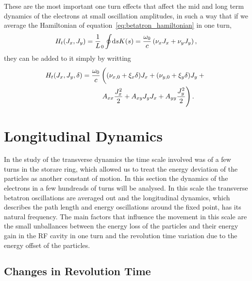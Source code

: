     These are the most important one turn effects that affect the mid and long term dynamics of the electrons at small oscillation amplitudes, in such a way that if we average the Hamiltonian of equation~\eqref{eq:betatron_hamiltonian} in one turn,
    \begin{align}
        H_t(J_x, J_y) = \frac1L_0\oint\!\text{d}s K(s) = \frac{\omega_0}{c}\left(\nu_xJ_x + \nu_yJ_y\right),
    \end{align}
    they can be added to it simply by writting
    \begin{align}\label{eq:average_transverse_hamiltonian}\nonumber
        H_t(J_x, J_y, \delta) = \frac{\omega_0}{c}
                                &\left(
                                    (\nu_{x,0} + \xi_x \delta) J_x +
                                    (\nu_{y,0} + \xi_y \delta) J_y +
                                \vphantom{\frac{1_1^2}{2}}\right.\\ &\left.
                                    A_{xx} \frac{J_x^2}{2} + A_{xy} J_yJ_x +
                                    A_{yy} \frac{J_y^2}{2}
                                \right).
    \end{align}

\section{Longitudinal Dynamics}

    In the study of the transverse dynamics the time scale involved was of a few turns in the storare ring, which allowed us to treat the energy deviation of the particles as another constant of motion. In this section the dynamics of the electrons in a few hundreads of turns will be analysed. In this scale the transverse betatron oscillations are averaged out and the longitudinal dynamics, which describes the path length and energy oscillations around the fixed point, has its natural frequency. The main factors that influence the movement in this scale are the small unballances between the energy loss of the particles and their energy gain in the RF cavity in one turn and the revolution time variation due to the energy offset of the particles.

\subsection{Changes in Revolution Time}\label{sec:longitudinal_deviations}

